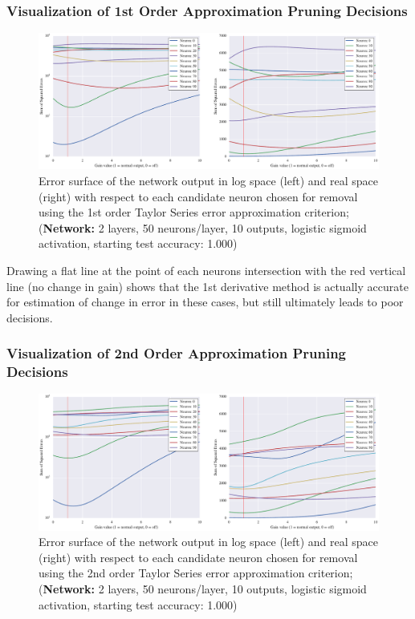 \subsubsection{Visualization of 1st Order Approximation Pruning Decisions}
\begin{figure}[!ht]
\centering
\includegraphics[width=\linewidth]{mnist-deep-g1-gain.pdf}
\caption{Error surface of the network output in log space (left) and real space (right) with respect to each candidate neuron chosen for removal using the 1st order Taylor Series error approximation criterion; (\textbf{Network:} 2 layers, 50 neurons/layer, 10 outputs, logistic sigmoid activation, starting test accuracy: 1.000)}
\label{fig:mnist-g1-double-layer}
\end{figure}

Drawing a flat line at the point of each neurons intersection with the red vertical line (no change in gain) shows that the 1st derivative method is actually accurate for estimation of change in error in these cases, but still ultimately leads to poor decisions. 

\subsubsection{Visualization of 2nd Order Approximation Pruning Decisions}
\begin{figure}[!ht]
\centering
\includegraphics[width=\linewidth]{mnist-deep-g2-gain.pdf}
\caption{Error surface of the network output in log space (left) and real space (right) with respect to each candidate neuron chosen for removal using the 2nd order Taylor Series error approximation criterion; (\textbf{Network:} 2 layers, 50 neurons/layer, 10 outputs, logistic sigmoid activation, starting test accuracy: 1.000)}
\label{fig:mnist-g2-double-layer}
\end{figure}

